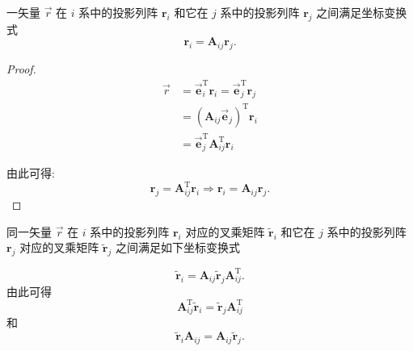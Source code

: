 \begin{property}[性质六]\label{prop:dcm-transform}
	一矢量 $\vec{r}$ 在 $i$ 系中的投影列阵 $\boldsymbol{r}_i$ 和它在 $j$ 系中的投影列阵 $\boldsymbol{r}_j$ 之间满足坐标变换式
	$$\boldsymbol{r}_i=\boldsymbol{A}_{ij}\boldsymbol{r}_j.$$
\end{property}

\begin{proof}
	$$\begin{aligned}
		\vec{r} & =\overrightarrow{\boldsymbol{e}}_{i}^{\mathrm{T}} \boldsymbol{r}_{i}=\overrightarrow{\boldsymbol{e}}_{j}^{\mathrm{T}} \boldsymbol{r}_{j} \\
		& =\left(\boldsymbol{A}_{i j} \overrightarrow{\boldsymbol{e}}_{j}\right)^{\mathrm{T}} \boldsymbol{r}_{i} \\
		& =\overrightarrow{\boldsymbol{e}}_{j}^{\mathrm{T}} \boldsymbol{A}_{i j}^{\mathrm{T}} \boldsymbol{r}_{i}
	\end{aligned}$$
	
	由此可得:
	$$\boldsymbol{r}_{j}=\boldsymbol{A}_{i j}^{\mathrm{T}} \boldsymbol{r}_{i} \Rightarrow \boldsymbol{r}_{i}=\boldsymbol{A}_{i j} \boldsymbol{r}_{j} .$$
\end{proof}

\begin{property}[性质七]\label{prop:dcm-skew-transform}
	同一矢量 $\vec{r}$ 在 $i$ 系中的投影列阵 $\boldsymbol{r}_i$ 对应的叉乘矩阵 $\tilde{\boldsymbol{r}}_i$ 和它在 $j$ 系中的投影列阵 $\boldsymbol{r}_j$ 对应的叉乘矩阵 $\tilde{\boldsymbol{r}}_j$ 之间满足如下坐标变换式
	
	 $$
	 \tilde{\boldsymbol{r}}_i=\boldsymbol{A}_{ij}\tilde{\boldsymbol{r}}_j\boldsymbol{A}_{ij}^{\mathrm{T}}.
	 $$
	由此可得
	 $$
	 \boldsymbol{A}_{ij}^{\mathrm{T}}\tilde{\boldsymbol{r}}_i=\tilde{\boldsymbol{r}}_j\boldsymbol{A}_{ij}^{\mathrm{T}}
	 $$和
	 $$
	 \tilde{\boldsymbol{r}}_i\boldsymbol{A}_{ij}=\boldsymbol{A}_{ij}\tilde{\boldsymbol{r}}_j.
	 $$
\end{property}

